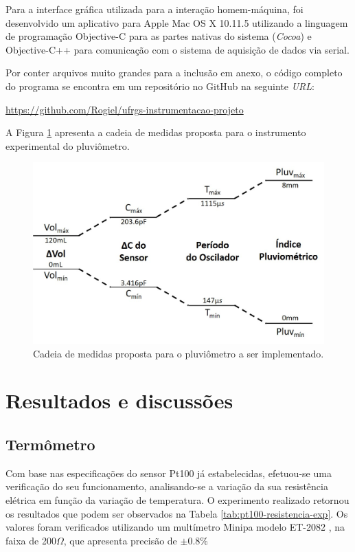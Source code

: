 \documentclass[a4paper]{instrumentacao}
\begin{document}
Para a interface gráfica utilizada para a interação homem-máquina, foi desenvolvido um aplicativo para Apple Mac OS X 10.11.5 utilizando a linguagem de programação Objective-C para as partes nativas do sistema (\textit{Cocoa}) e Objective-C++ para comunicação com o sistema de aquisição de dados via serial.

Por conter arquivos muito grandes para a inclusão em anexo, o código completo do programa se encontra em um repositório no GitHub na seguinte \textit{URL}:

\url{https://github.com/Rogiel/ufrgs-instrumentacao-projeto}

A Figura \ref{fig:pluviometro-cadeia-medidas-proposta} apresenta a cadeia de medidas proposta para o instrumento experimental do pluviômetro.

\begin{figure}[H]
	\centering
	\includegraphics[width=\textwidth]{pluviometro-cadeia-medidas-proposta.jpg}
	\caption{Cadeia de medidas proposta para o pluviômetro a ser implementado.}
	\label{fig:pluviometro-cadeia-medidas-proposta}
\end{figure}

\chapter{Resultados e discussões}

\section{Termômetro}

Com base nas especificações do sensor Pt100 já estabelecidas, efetuou-se uma verificação do seu funcionamento, analisando-se a variação da sua resistência elétrica em função da variação de temperatura. O experimento realizado retornou os resultados que podem ser observados na Tabela \ref{tab:pt100-resistencia-exp}. Os valores foram verificados utilizando um multímetro Minipa modelo ET-2082 \cite{multimetro-minipa}, na faixa de 200$\Omega$, que apresenta precisão de $\pm 0.8\%$
\end{document}
